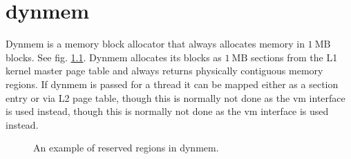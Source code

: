\chapter{dynmem}

Dynmem is a memory block allocator that always allocates memory in
$1 \:\textrm{MB}$ blocks. See fig. \ref{figure:dynmem_blocks}.
Dynmem allocates its blocks as $1 \:\textrm{MB}$ sections from the L1 kernel
master page table and always returns physically contiguous memory regions. If
dynmem is passed for a thread it can be mapped either as a section entry or
via L2 page table, though this is normally not done as the vm interface is
used instead, though this is normally not done as the vm interface is
used instead.

\begin{figure}
  
  \centering
  \caption{An example of reserved regions in dynmem.}
  \label{figure:dynmem_blocks}
\end{figure}
